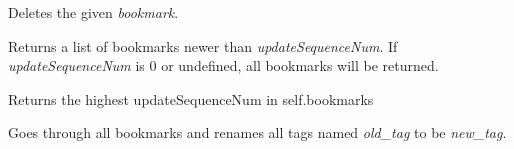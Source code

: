 \documentclass[letterpaper,10pt,openany]{sphinxmanual}
\begin{document}
\begin{fulllineitems}
\begin{fulllineitems}
\end{fulllineitems}


\begin{fulllineitems}
\label{Applications/terminal/plugin_bookmarks:bookmarks.BookmarksDB.delete_bookmark}
Deletes the given \emph{bookmark}.

\end{fulllineitems}


\begin{fulllineitems}
\label{Applications/terminal/plugin_bookmarks:bookmarks.BookmarksDB.get_bookmarks}
Returns a list of bookmarks newer than \emph{updateSequenceNum}.
If \emph{updateSequenceNum} is 0 or undefined, all bookmarks will be
returned.

\end{fulllineitems}


\begin{fulllineitems}
\label{Applications/terminal/plugin_bookmarks:bookmarks.BookmarksDB.get_highest_USN}
Returns the highest updateSequenceNum in self.bookmarks

\end{fulllineitems}


\begin{fulllineitems}
\label{Applications/terminal/plugin_bookmarks:bookmarks.BookmarksDB.rename_tag}
Goes through all bookmarks and renames all tags named \emph{old\_tag} to be
\emph{new\_tag}.

\end{fulllineitems}


\end{fulllineitems}

\end{document}
